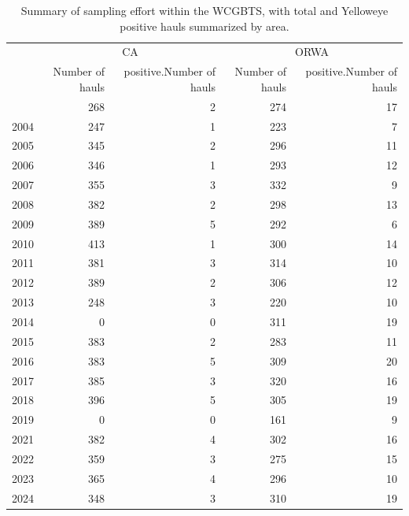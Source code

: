 \documentclass[
]{scrartcl}
\begin{document}
\begin{longtable}{l|rrrr}

\caption{\label{tbl-sampling-effort-nwfsc}Summary of sampling effort
within the WCGBTS, with total and Yelloweye positive hauls summarized by
area.}

\tabularnewline

\toprule
 & \multicolumn{2}{c}{CA} & \multicolumn{2}{c}{ORWA} \\ 
\cmidrule(lr){2-3} \cmidrule(lr){4-5}
 & Number of hauls & positive.Number of hauls & Number of hauls & positive.Number of hauls \\ 
\midrule\addlinespace[2.5pt]
2003 & 268 & 2 & 274 & 17 \\ 
2004 & 247 & 1 & 223 & 7 \\ 
2005 & 345 & 2 & 296 & 11 \\ 
2006 & 346 & 1 & 293 & 12 \\ 
2007 & 355 & 3 & 332 & 9 \\ 
2008 & 382 & 2 & 298 & 13 \\ 
2009 & 389 & 5 & 292 & 6 \\ 
2010 & 413 & 1 & 300 & 14 \\ 
2011 & 381 & 3 & 314 & 10 \\ 
2012 & 389 & 2 & 306 & 12 \\ 
2013 & 248 & 3 & 220 & 10 \\ 
2014 & 0 & 0 & 311 & 19 \\ 
2015 & 383 & 2 & 283 & 11 \\ 
2016 & 383 & 5 & 309 & 20 \\ 
2017 & 385 & 3 & 320 & 16 \\ 
2018 & 396 & 5 & 305 & 19 \\ 
2019 & 0 & 0 & 161 & 9 \\ 
2021 & 382 & 4 & 302 & 16 \\ 
2022 & 359 & 3 & 275 & 15 \\ 
2023 & 365 & 4 & 296 & 10 \\ 
2024 & 348 & 3 & 310 & 19 \\ 
\bottomrule

\end{longtable}

\endgroup

\begingroup
\fontsize{9.0pt}{10.8pt}\selectfont
\end{document}
